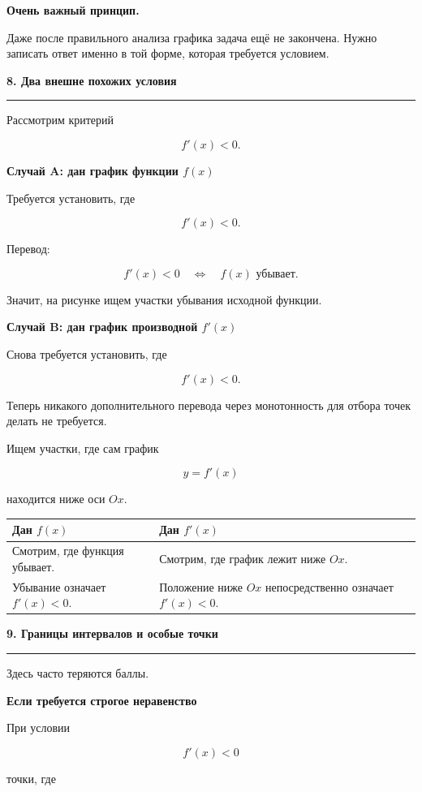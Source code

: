 \documentclass[a4paper,12pt]{article}
\newcommand{\maintitle}[1]{%
    {\Large\bfseries\color{darkaccent}#1\par}
    \vspace{2mm}
    {\color{accent}\rule{\linewidth}{0.6pt}}
    \vspace{4mm}
}
\newcommand{\subhead}[1]{%
    \vspace{3mm}
    {\large\bfseries\color{darkaccent}#1\par}
    \vspace{1mm}
}
\newcommand{\keypoint}[1]{%
    \par
    \vspace{1mm}
    {\color{darkaccent}\bfseries #1}
}
\begin{document}
\keypoint{Очень важный принцип.}
Даже после правильного анализа графика задача ещё не закончена.
Нужно записать ответ именно в той форме, которая требуется условием.

\maintitle{8. Два внешне похожих условия}

Рассмотрим критерий

\[
f'(x)<0.
\]

\subhead{Случай A: дан график функции \(f(x)\)}

Требуется установить, где

\[
f'(x)<0.
\]

Перевод:

\[
f'(x)<0
\quad\Longleftrightarrow\quad
f(x)\text{ убывает}.
\]

Значит, на рисунке ищем участки убывания исходной функции.

\subhead{Случай B: дан график производной \(f'(x)\)}

Снова требуется установить, где

\[
f'(x)<0.
\]

Теперь никакого дополнительного перевода через монотонность для отбора
точек делать не требуется.

Ищем участки, где сам график

\[
y=f'(x)
\]

находится ниже оси \(Ox\).

\begin{center}
\begin{tabularx}{0.94\linewidth}{@{}X X@{}}
\toprule
Дан \(f(x)\) & Дан \(f'(x)\) \\
\midrule
Смотрим, где функция убывает. &
Смотрим, где график лежит ниже \(Ox\). \\[1mm]

Убывание означает \(f'(x)<0\). &
Положение ниже \(Ox\) непосредственно означает \(f'(x)<0\). \\
\bottomrule
\end{tabularx}
\end{center}

\maintitle{9. Границы интервалов и особые точки}

Здесь часто теряются баллы.

\subhead{Если требуется строгое неравенство}

При условии

\[
f'(x)<0
\]

точки, где
\end{document}
